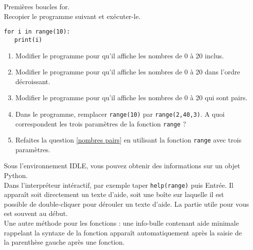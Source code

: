 \begin{exercice}\label{exercice boucle for} Premières boucles for.\\ 
Recopier le programme suivant et exécuter-le.
\begin{verbatim}
for i in range(10):
   print(i)
\end{verbatim}
\begin{enumerate}
\item Modifier le programme pour qu'il affiche les nombres de 0 à 20 inclus.
\item Modifier le programme pour qu'il affiche les nombres de 0 à 20 dans l'ordre décroissant.
\item \label{nombres pairs} Modifier le programme pour qu'il affiche les nombres de 0 à 20 qui sont pairs. 
\item Dans le programme, remplacer \verb?range(10)? par \verb?range(2,40,3)?. A quoi correspondent les trois paramètres de la fonction \verb?range? ?
\item Refaites la question \ref{nombres pairs} en utilisant la fonction \verb?range? avec trois paramètres.
\end{enumerate} 
\end{exercice}
\bigskip

\begin{remark}
Sous l'environnement IDLE, vous pouvez obtenir des informations sur un objet Python. \\
Dans l'interpréteur intéractif, par exemple taper \verb?help(range)? puis Entrée. Il apparaît soit directement un texte d'aide, soit une boîte sur laquelle il est possible de double-cliquer pour dérouler un texte d'aide. La partie utile pour vous est souvent au début.\\
Une autre méthode pour les fonctions : une info-bulle contenant aide minimale rappelant la syntaxe de la fonction appara\^ it automatiquement après la saisie de la parenthèse gauche après une fonction.
\end{remark}
\bigskip 



